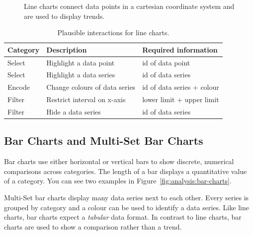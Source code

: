 \begin{figure}
  \begin{center}
    \qquad
  \caption{Line charts connect data points in a cartesian coordinate system and are used to display trends.}
  \label{fig:analysis:line-graphs}
  \end{center}
\end{figure}

\begin{table}[H]
  \centering
  \caption{Plausible interactions for line charts.}%
  \label{tab:analysis:line-graph:interactions}
  \begin{tabularx}{\linewidth}{lXX}
    \bf Category & \bf Description & \bf Required information \\
    \hline
    Select & Highlight a data point & id of data point \\
    Select & Highlight a data series & id of data series \\
    Encode & Change colours of data series & id of data series + colour \\
    Filter & Restrict interval on x-axis & lower limit + upper limit \\
    Filter & Hide a data series & id of data series \\
  \end{tabularx}
\end{table}




\subsection{Bar Charts and Multi-Set Bar Charts}

Bar charts use either horizontal or vertical bars to show discrete, numerical comparisons across categories.
The length of a bar displays a quantitative value of a category.
You can see two examples in Figure~\ref{fig:analysis:bar-charts}.

Multi-Set bar charts display many data series next to each other.
Every series is grouped by category and a colour can be used to identify a data series.
Like line charts, bar charts expect a \emph{tabular} data format.
In contrast to line charts, bar charts are used to show a comparison rather than a trend.

